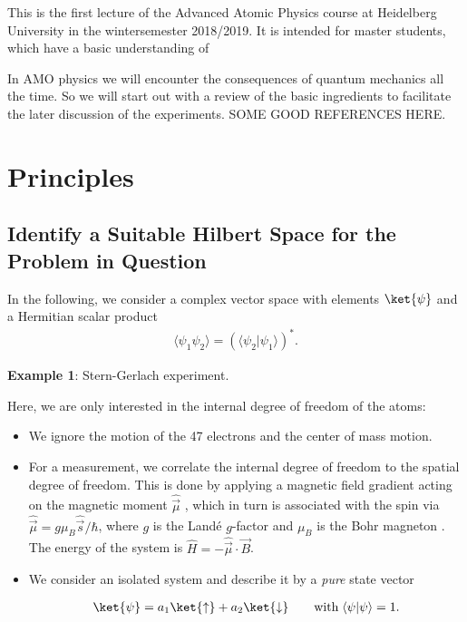 This is the first lecture of the Advanced Atomic Physics course at Heidelberg University in the wintersemester 2018/2019. It is intended for master students, which have a basic understanding of 

In AMO physics we will encounter the consequences of quantum mechanics all the time. So we will start out with a review of the basic ingredients to facilitate the later discussion of the experiments. SOME GOOD REFERENCES HERE.

\section{Principles}

\subsection{Identify a Suitable Hilbert Space for the Problem in Question}

In the following, we consider a complex vector space with elements $\ket{\psi}$ and a Hermitian scalar product
\begin{align}
				\langle\psi_1 \psi_2\rangle=(\langle{\psi_2}| \psi_1\rangle)^*.
\end{align}

\textbf{Example 1}: Stern-Gerlach experiment.

Here, we are only interested in the internal degree of freedom of the atoms:

\begin{itemize}
						\item 	We ignore the motion of the 47 electrons and the center of mass motion.
						\item 	For a measurement, we correlate the internal degree of freedom to the spatial degree of freedom. This is done by applying a magnetic field gradient acting on the magnetic moment $\hat{\vec{\mu}}$ , which in turn is associated with the spin via $\hat{\vec{\mu}} = g \mu_B \hat{\vec{s}}/\hbar$, where $g$ is the Landé $g$-factor  and $\mu_B$ is the Bohr magneton . The energy of the system is $\hat{H} = -\hat{\vec{\mu}} \cdot \vec{B}$.
						\item 	We consider an isolated system and describe it by a \emph{pure} state vector

\begin{align}
	\ket{\psi} = a_1 \ket{\uparrow} + a_2 \ket{\downarrow}  \qquad \text{with} \; \langle\psi | \psi\rangle = 1.
\end{align}
					
\end{itemize}